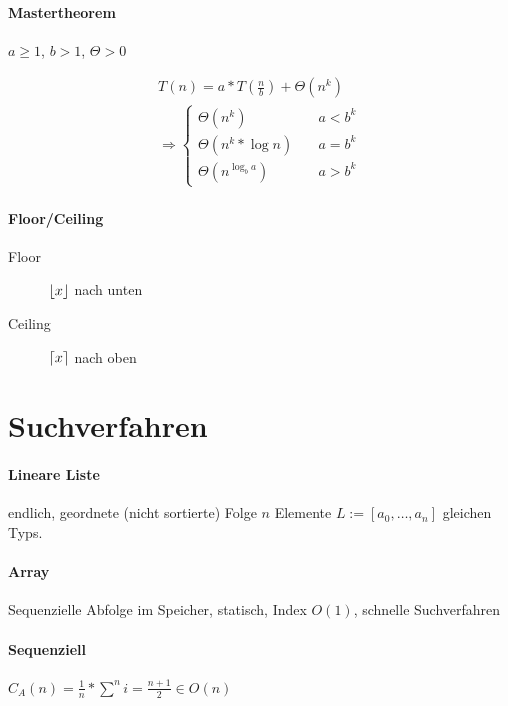 \paragraph{Mastertheorem} $a \geq 1$, $b > 1$, $\Theta > 0$


\begin{gather*}
  T(n) = a * T( \frac{n}{b} ) + \Theta (n^k) \\
  \Rightarrow \begin{cases}
    \Theta ( n^k ) \quad          & a < b^k \\
    \Theta ( n^k * \log n ) \quad & a = b^k \\
    \Theta ( n^{\log_b a} ) \quad & a > b^k
  \end{cases}
\end{gather*}

\paragraph{Floor/Ceiling}

\begin{description}
  \item [Floor] $\lfloor x\rfloor$ nach unten

  \item [Ceiling] $\lceil x\rceil$ nach oben
\end{description}

\section{Suchverfahren}

\paragraph{Lineare Liste}
endlich, geordnete (nicht sortierte) Folge $n$ Elemente $L := [a_0, \dots, a_n]$ gleichen Typs.

\paragraph{Array}
Sequenzielle Abfolge im Speicher, statisch, Index $O(1)$, schnelle Suchverfahren

\paragraph{Sequenziell}
$C_A(n) = \frac{1}{n} * \sum^n i = \frac{n + 1}{2} \in O(n)$\

